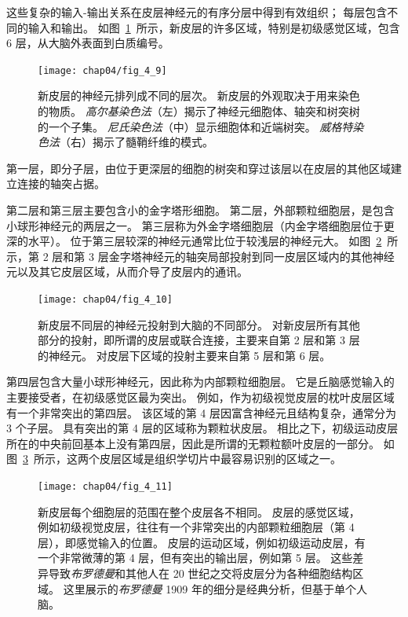 这些复杂的输入-输出关系在皮层神经元的有序分层中得到有效组织； 每层包含不同的输入和输出。 
如图~\ref{fig:4_9}~所示，新皮层的许多区域，特别是初级感觉区域，包含 6 层，从大脑外表面到白质编号。

\begin{figure}[htbp]
	\centering
	\texttt{[image: chap04/fig\_4\_9]}
	\caption{新皮层的神经元排列成不同的层次。 
		新皮层的外观取决于用来染色的物质。 
		\textit{高尔基染色法}（左）揭示了神经元细胞体、轴突和树突树的一个子集。 
		\textit{尼氏染色法}（中）显示细胞体和近端树突。
		\textit{威格特染色法}（右）揭示了髓鞘纤维的模式\cite{heimer2012human}。}
	\label{fig:4_9}
\end{figure}


第一层，即分子层，由位于更深层的细胞的树突和穿过该层以在皮层的其他区域建立连接的轴突占据。


第二层和第三层主要包含小的金字塔形细胞。
第二层，外部颗粒细胞层，是包含小球形神经元的两层之一。
第三层称为外金字塔细胞层（内金字塔细胞层位于更深的水平）。 
位于第三层较深的神经元通常比位于较浅层的神经元大。 
如图~\ref{fig:4_10}~所示，第 2 层和第 3 层金字塔神经元的轴突局部投射到同一皮层区域内的其他神经元以及其它皮层区域，从而介导了皮层内的通讯。

\begin{figure}[htbp]
	\centering
	\texttt{[image: chap04/fig\_4\_10]}
	\caption{新皮层不同层的神经元投射到大脑的不同部分。
		对新皮层所有其他部分的投射，即所谓的皮层或联合连接，主要来自第 2 层和第 3 层的神经元。
		对皮层下区域的投射主要来自第 5 层和第 6 层\cite{jones1986connectivity}。}
	\label{fig:4_10}
\end{figure}


第四层包含大量小球形神经元，因此称为内部颗粒细胞层。 
它是丘脑感觉输入的主要接受者，在初级感觉区最为突出。 
例如，作为初级视觉皮层的枕叶皮层区域有一个非常突出的第四层。 
该区域的第 4 层因富含神经元且结构复杂，通常分为 3 个子层。
具有突出的第 4 层的区域称为颗粒状皮层。 
相比之下，初级运动皮层所在的中央前回基本上没有第四层，因此是所谓的无颗粒额叶皮层的一部分。 
如图~\ref{fig:4_11}~所示，这两个皮层区域是组织学切片中最容易识别的区域之一。

\begin{figure}[htbp]
	\centering
	\texttt{[image: chap04/fig\_4\_11]}
	\caption{新皮层每个细胞层的范围在整个皮层各不相同。
		皮层的感觉区域，例如初级视觉皮层，往往有一个非常突出的内部颗粒细胞层（第 4 层），即感觉输入的位置。
		皮层的运动区域，例如初级运动皮层，有一个非常微薄的第 4 层，但有突出的输出层，例如第 5 层。
		这些差异导致\textit{布罗德曼}和其他人在 20 世纪之交将皮层分为各种细胞结构区域。
		这里展示的\textit{布罗德曼} 1909 年的细分是经典分析，但基于单个人脑\cite{martin2012neuroanatomy}。}
	\label{fig:4_11}
\end{figure}


